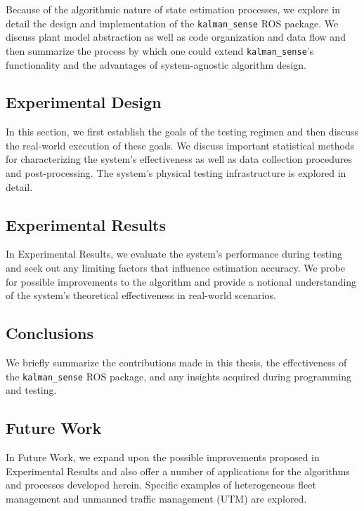 Because of the algorithmic nature of state estimation processes, we explore in detail the design and implementation of the \texttt{kalman\_sense} ROS package. We discuss plant model abstraction as well as code organization and data flow and then summarize the process by which one could extend \texttt{kalman\_sense}'s functionality and the advantages of system-agnostic algorithm design.

\subsection*{Experimental Design}

In this section, we first establish the goals of the testing regimen and then discuss the real-world execution of these goals. We discuss important statistical methods for characterizing the system's effectiveness as well as data collection procedures and post-processing. The system's physical testing infrastructure is explored in detail.

\subsection*{Experimental Results}

In Experimental Results, we evaluate the system's performance during testing and seek out any limiting factors that influence estimation accuracy. We probe for possible improvements to the algorithm and provide a notional understanding of the system's theoretical effectiveness in real-world scenarios.

\subsection*{Conclusions}

We briefly summarize the contributions made in this thesis, the effectiveness of the \texttt{kalman\_sense} ROS package, and any insights acquired during programming and testing. 

\subsection*{Future Work}

In Future Work, we expand upon the possible improvements proposed in Experimental Results and also offer a number of applications for the algorithms and processes developed herein. Specific examples of heterogeneous fleet management and unmanned traffic management (UTM) are explored.